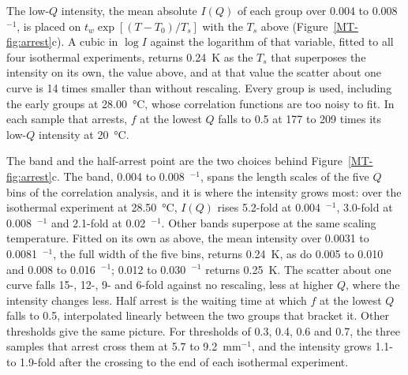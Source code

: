 \documentclass[11pt]{article}
\newcommand{\Ainv}{\text{\AA}$^{-1}$}
\begin{document}
The low-$Q$ intensity, the mean absolute $I(Q)$ of each group over 0.004 to 0.008~\Ainv, is placed on $t_w\exp[(T-T_0)/T_s]$ with the $T_s$ above (Figure~\ref*{MT-fig:arrest}c). A cubic in $\log I$ against the logarithm of that variable, fitted to all four isothermal experiments, returns 0.24~K as the $T_s$ that superposes the intensity on its own, the value above, and at that value the scatter about one curve is 14 times smaller than without rescaling. Every group is used, including the early groups at \SI{28.00}{\degreeCelsius}, whose correlation functions are too noisy to fit. In each sample that arrests, $f$ at the lowest $Q$ falls to 0.5 at 177 to 209 times its low-$Q$ intensity at \SI{20}{\degreeCelsius}.

The band and the half-arrest point are the two choices behind Figure~\ref*{MT-fig:arrest}c. The band, 0.004 to 0.008~\Ainv, spans the length scales of the five $Q$ bins of the correlation analysis, and it is where the intensity grows most: over the isothermal experiment at \SI{28.50}{\degreeCelsius}, $I(Q)$ rises 5.2-fold at 0.004~\Ainv, 3.0-fold at 0.008~\Ainv{} and 2.1-fold at 0.02~\Ainv. Other bands superpose at the same scaling temperature. Fitted on its own as above, the mean intensity over 0.0031 to 0.0081~\Ainv, the full width of the five bins, returns 0.24~K, as do 0.005 to 0.010 and 0.008 to 0.016~\Ainv; 0.012 to 0.030~\Ainv{} returns 0.25~K. The scatter about one curve falls 15-, 12-, 9- and 6-fold against no rescaling, less at higher $Q$, where the intensity changes less. Half arrest is the waiting time at which $f$ at the lowest $Q$ falls to 0.5, interpolated linearly between the two groups that bracket it. Other thresholds give the same picture. For thresholds of 0.3, 0.4, 0.6 and 0.7, the three samples that arrest cross them at 5.7 to 9.2~mm$^{-1}$, and the intensity grows 1.1- to 1.9-fold after the crossing to the end of each isothermal experiment.
\end{document}
